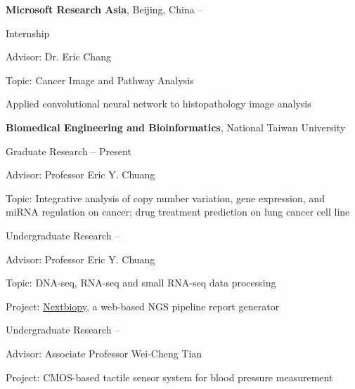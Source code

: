 \documentclass[a4paper,12pt,oneside]{article}
\begin{document}
\begin{body}
\textbf{Microsoft Research Asia},
Beijing, China
\hfill
{} --
\par
Internship
\begin{detail}
    \begin{detailitem}
    \item Advisor: Dr. Eric Chang
    \item Topic: Cancer Image and Pathway Analysis
    \item Applied convolutional neural network to histopathology image analysis
    \end{detailitem}
\end{detail}


\BigEntryGapNoBreak
\textbf{Biomedical Engineering and Bioinformatics},
National Taiwan University
\par
Graduate Research
\hfill
{} --
Present
\begin{detailitem}
    \item Advisor: Professor Eric Y. Chuang
    \item Topic: Integrative analysis of copy number variation, gene expression, and miRNA regulation on cancer; drug treatment prediction on lung cancer cell line
\end{detailitem}


\EntryGapNoBreak
Undergraduate Research%
\hfill
{} --
\begin{detail}
    \begin{detailitem}
    \item Advisor: Professor Eric Y. Chuang
    \item Topic: DNA-seq, RNA-seq and small RNA-seq data processing
    \item Project: \href{https://github.com/BioCloud-TW/nextbiopy}{Nextbiopy}, a web-based NGS pipeline report generator
    \end{detailitem}
\end{detail}

\EntryGapNoBreak
Undergraduate Research%
\hfill
{} --
\begin{detail}
    \begin{detailitem}
    \item Advisor: Associate Professor Wei-Cheng Tian
    \item Project: CMOS-based tactile sensor system for blood pressure measurement
    \end{detailitem}
\end{detail}


\end{body}
\end{document}
